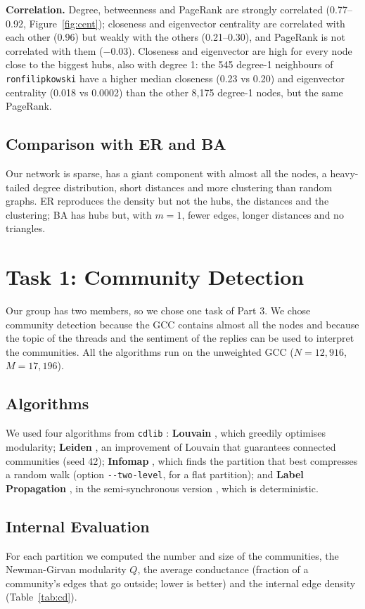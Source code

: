 \documentclass[sigchi]{acmart}
\begin{document}
\textbf{Correlation.} Degree, betweenness and PageRank are strongly correlated (0.77--0.92, Figure~\ref{fig:cent}); closeness and eigenvector centrality are correlated with each other (0.96) but weakly with the others (0.21--0.30), and PageRank is not correlated with them ($-0.03$). Closeness and eigenvector are high for every node close to the biggest hubs, also with degree 1: the 545 degree-1 neighbours of \texttt{ronfilipkowski} have a higher median closeness (0.23 vs 0.20) and eigenvector centrality (0.018 vs 0.0002) than the other 8,175 degree-1 nodes, but the same PageRank.

\subsection{Comparison with ER and BA}
Our network is sparse, has a giant component with almost all the nodes, a heavy-tailed degree distribution, short distances and more clustering than random graphs. ER reproduces the density but not the hubs, the distances and the clustering; BA has hubs but, with $m=1$, fewer edges, longer distances and no triangles.

\section{Task 1: Community Detection}\label{sec:cd}
Our group has two members, so we chose one task of Part 3. We chose community detection because the GCC contains almost all the nodes and because the topic of the threads and the sentiment of the replies can be used to interpret the communities. All the algorithms run on the unweighted GCC ($N=12{,}916$, $M=17{,}196$).

\subsection{Algorithms}
We used four algorithms from \texttt{cdlib} \cite{rossetti2019cdlib}: \textbf{Louvain} \cite{blondel2008louvain}, which greedily optimises modularity; \textbf{Leiden} \cite{traag2019leiden}, an improvement of Louvain that guarantees connected communities (seed 42); \textbf{Infomap} \cite{rosvall2008infomap}, which finds the partition that best compresses a random walk (option \texttt{-{}-two-level}, for a flat partition); and \textbf{Label Propagation} \cite{raghavan2007lpa}, in the semi-synchronous version \cite{cordasco2010semisync}, which is deterministic.

\subsection{Internal Evaluation}
For each partition we computed the number and size of the communities, the Newman-Girvan modularity $Q$, the average conductance (fraction of a community's edges that go outside; lower is better) and the internal edge density (Table~\ref{tab:cd}).
\end{document}
